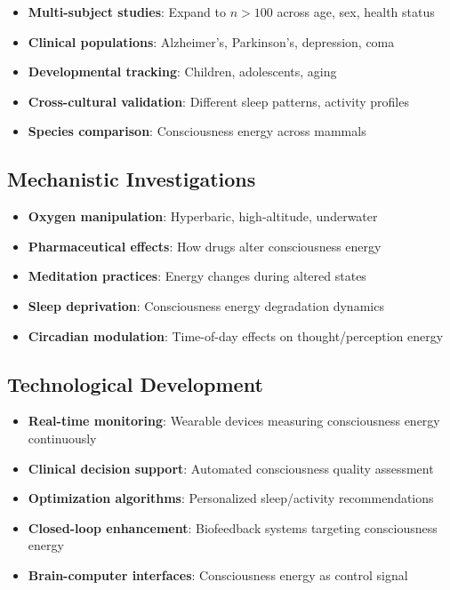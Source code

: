 \documentclass[12pt,twocolumn]{article}
\theoremstyle{remark}
\begin{document}
\begin{itemize}
\item \textbf{Multi-subject studies}: Expand to $n > 100$ across age, sex, health status
\item \textbf{Clinical populations}: Alzheimer's, Parkinson's, depression, coma
\item \textbf{Developmental tracking}: Children, adolescents, aging
\item \textbf{Cross-cultural validation}: Different sleep patterns, activity profiles
\item \textbf{Species comparison}: Consciousness energy across mammals
\end{itemize}

\subsection{Mechanistic Investigations}

\begin{itemize}
\item \textbf{Oxygen manipulation}: Hyperbaric, high-altitude, underwater
\item \textbf{Pharmaceutical effects}: How drugs alter consciousness energy
\item \textbf{Meditation practices}: Energy changes during altered states
\item \textbf{Sleep deprivation}: Consciousness energy degradation dynamics
\item \textbf{Circadian modulation}: Time-of-day effects on thought/perception energy
\end{itemize}

\subsection{Technological Development}

\begin{itemize}
\item \textbf{Real-time monitoring}: Wearable devices measuring consciousness energy continuously
\item \textbf{Clinical decision support}: Automated consciousness quality assessment
\item \textbf{Optimization algorithms}: Personalized sleep/activity recommendations
\item \textbf{Closed-loop enhancement}: Biofeedback systems targeting consciousness energy
\item \textbf{Brain-computer interfaces}: Consciousness energy as control signal
\end{itemize}
\end{document}
